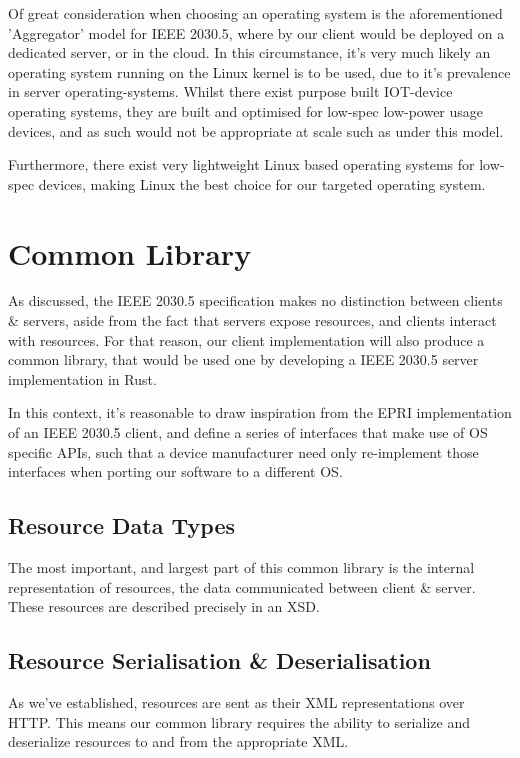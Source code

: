 Of great consideration when choosing an operating system is the aforementioned 'Aggregator' model for IEEE 2030.5, where by our client would be deployed on a dedicated server, or in the cloud. In this circumstance, it's very much likely an operating system running on the Linux kernel is to be used, due to it's prevalence in server operating-systems.
Whilst there exist purpose built IOT-device operating systems, they are built and optimised for low-spec low-power usage devices, and as such would not be appropriate at scale such as under this model.

Furthermore, there exist very lightweight Linux based operating systems for low-spec devices, making Linux the best choice for our targeted operating system.

\section{Common Library}
As discussed, the IEEE 2030.5 specification makes no distinction between clients \& servers, aside from the fact that servers expose resources, and clients interact with resources. 
For that reason, our client implementation will also produce a common library, that would be used one by developing a IEEE 2030.5 server implementation in Rust.

In this context, it's reasonable to draw inspiration from the EPRI implementation of an IEEE 2030.5 client, and define a series of interfaces that make use of OS specific APIs, such that a device manufacturer need only re-implement those interfaces when porting our software to a different OS.

\subsection{Resource Data Types}
The most important, and largest part of this common library is the internal representation of resources, the data communicated between client \& server. These resources are described precisely in an XSD.



\subsection{Resource Serialisation \& Deserialisation}
As we've established, resources are sent as their XML representations over HTTP. This means our common library requires the ability to serialize and deserialize resources to and from the appropriate XML.


